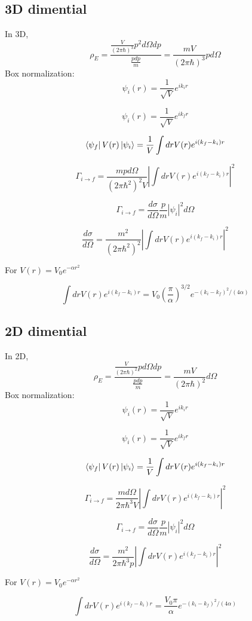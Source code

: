 \documentclass[12pt,twoside]{article}
\begin{document}
\subsection{3D dimential}

In 3D,
$$
\rho_E = \frac{
\frac{V}{(2\pi\hbar)^3}{ p^2 d\Omega dp}
}{
\frac{p dp}{m}
}
=
\frac{m V}{(2\pi\hbar)^3}{ p d\Omega}
$$
Box normalization:
$$
\psi_i(r) = \frac{1}{\sqrt{V}} e^{i k_i r}
$$

$$
\psi_i(r) = \frac{1}{\sqrt{V}} e^{i k_f r}
$$

$$
\bra{\psi_f} V(r) \ket{\psi_i} =  \frac{1}{V} \int dr V(r) e^{i(k_f - k_i) r}
$$

$$
\Gamma_{i\rightarrow f} = \frac{mp d\Omega}{(2\pi \hbar^2)^2 V} |\int dr V(r) e^{i(k_f - k_i) r}|^2
$$

$$
\Gamma_{i\rightarrow f} = \frac{d\sigma}{d\Omega} \frac{p}{m} |\psi_i|^2 d\Omega
$$

$$
\frac{d\sigma}{d\Omega} = \frac{m^2}{(2\pi \hbar^2)^2} |\int dr V(r) e^{i(k_f - k_i) r}|^2
$$

For $V(r) = V_0 e^{-\alpha r^2}$

$$
\int dr V(r) e^{i(k_f - k_i) r} = V_0 (\frac{\pi}{\alpha})^{3/2} e^{-(k_i - k_f)^2/(4\alpha)}
$$


\subsection{2D dimential}

In 2D,
$$
\rho_E = \frac{
\frac{V}{(2\pi\hbar)^2}{ p d\Omega dp}
}{
\frac{p dp}{m}
}
=
\frac{m V}{(2\pi\hbar)^2}{d\Omega}
$$
Box normalization:
$$
\psi_i(r) = \frac{1}{\sqrt{V}} e^{i k_i r}
$$

$$
\psi_i(r) = \frac{1}{\sqrt{V}} e^{i k_f r}
$$

$$
\bra{\psi_f} V(r) \ket{\psi_i} =  \frac{1}{V} \int dr V(r) e^{i(k_f - k_i) r}
$$

$$
\Gamma_{i\rightarrow f} = \frac{m d\Omega}{2\pi \hbar^3 V} |\int dr V(r) e^{i(k_f - k_i) r}|^2
$$

$$
\Gamma_{i\rightarrow f} = \frac{d\sigma}{d\Omega} \frac{p}{m} |\psi_i|^2 d\Omega
$$

$$
\frac{d\sigma}{d\Omega} = \frac{m^2}{2\pi \hbar^3 p} |\int dr V(r) e^{i(k_f - k_i) r}|^2
$$

For $V(r) = V_0 e^{-\alpha r^2}$

$$
\int dr V(r) e^{i(k_f - k_i) r} = \frac{V_0 \pi}{\alpha} e^{-(k_i - k_f)^2/(4\alpha)}
$$
\end{document}
